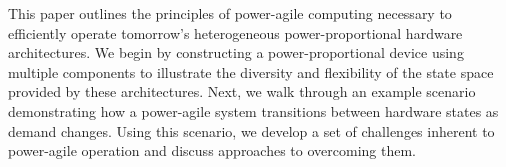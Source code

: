This paper outlines the principles of power-agile computing necessary to
efficiently operate tomorrow's heterogeneous power-proportional hardware
architectures. We begin by constructing a power-proportional device using
multiple components to illustrate the diversity and flexibility of the state
space provided by these architectures. Next, we walk through an example
scenario demonstrating how a power-agile system transitions between hardware
states as demand changes. Using this scenario, we develop a set of challenges
inherent to power-agile operation and discuss approaches to overcoming them.
